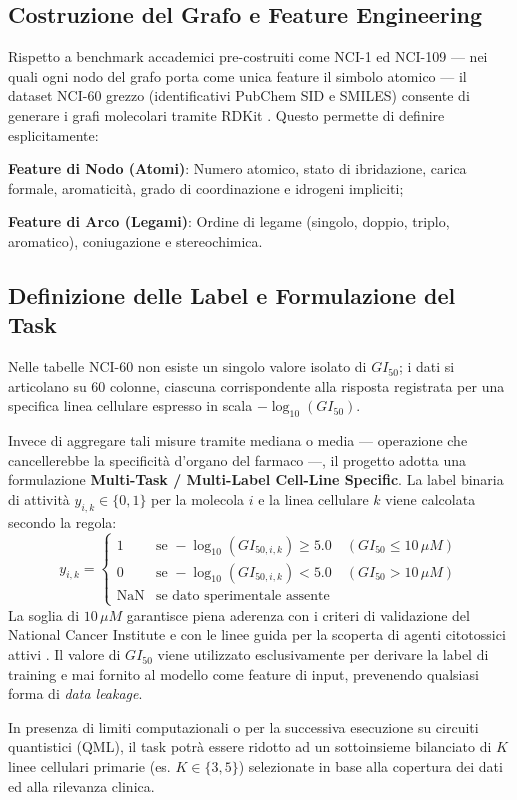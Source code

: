 \documentclass[12pt, a4paper]{article}
\begin{document}
\subsection{Costruzione del Grafo e Feature Engineering}
Rispetto a benchmark accademici pre-costruiti come NCI-1 ed NCI-109 \cite{wale2008nci1} — nei quali ogni nodo del grafo porta come unica feature il simbolo atomico — il dataset NCI-60 grezzo (identificativi PubChem SID e SMILES) consente di generare i grafi molecolari tramite RDKit \cite{rdkit}. Questo permette di definire esplicitamente:
\begin{*itemize}
    \item \textbf{Feature di Nodo (Atomi)}: Numero atomico, stato di ibridazione, carica formale, aromaticità, grado di coordinazione e idrogeni impliciti;
    \item \textbf{Feature di Arco (Legami)}: Ordine di legame (singolo, doppio, triplo, aromatico), coniugazione e stereochimica.
\end{*itemize}

\subsection{Definizione delle Label e Formulazione del Task}
Nelle tabelle NCI-60 non esiste un singolo valore isolato di $GI_{50}$; i dati si articolano su 60 colonne, ciascuna corrispondente alla risposta registrata per una specifica linea cellulare espresso in scala $-\log_{10}(GI_{50})$.

Invece di aggregare tali misure tramite mediana o media — operazione che cancellerebbe la specificità d'organo del farmaco —, il progetto adotta una formulazione \textbf{Multi-Task / Multi-Label Cell-Line Specific}. La label binaria di attività $y_{i, k} \in \{0, 1\}$ per la molecola $i$ e la linea cellulare $k$ viene calcolata secondo la regola:
\begin{equation}
y_{i, k} = 
\begin{cases} 
1 & \text{se } -\log_{10}(GI_{50, i, k}) \geq 5.0 \quad (GI_{50} \le 10\,\mu M) \\
0 & \text{se } -\log_{10}(GI_{50, i, k}) < 5.0 \quad (GI_{50} > 10\,\mu M) \\
\text{NaN} & \text{se dato sperimentale assente}
\end{cases}
\end{equation}
La soglia di $10\,\mu M$ garantisce piena aderenza con i criteri di validazione del National Cancer Institute e con le linee guida per la scoperta di agenti citotossici attivi \cite{jnp_guidelines}. Il valore di $GI_{50}$ viene utilizzato esclusivamente per derivare la label di training e mai fornito al modello come feature di input, prevenendo qualsiasi forma di \emph{data leakage}.

In presenza di limiti computazionali o per la successiva esecuzione su circuiti quantistici (QML), il task potrà essere ridotto ad un sottoinsieme bilanciato di $K$ linee cellulari primarie (es. $K \in \{3, 5\}$) selezionate in base alla copertura dei dati ed alla rilevanza clinica.

\end{document}
